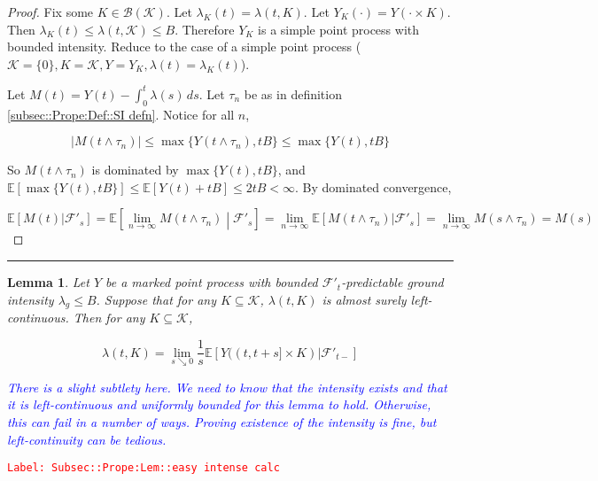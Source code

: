 \documentclass[12pt]{article}
\newcommand{\mb}{\mathbb}
\newcommand{\mc}{\mathcal}
\newcommand{\ms}{\mathscr}
\newcommand{\ra}{\rightarrow}
\newcommand{\tr}{\textcolor{red}}
\newcommand{\tb}{\textcolor{blue}}
\newcommand{\labe}[1]{\tr{\texttt{Label: #1}}}
\newcommand{\lin}{\rule{\linewidth}{0.4 pt}}
\newcommand{\ex}[1]{\mb{E}\left[#1\right]}			%
\newtheorem{lem}[thms]{Lemma}
\begin{document}
\begin{proof}
Fix some \(K \in \ms{B}(\mc{K})\). Let \(\lambda_K(t) = \lambda(t,K)\). Let \(Y_K(\cdot) = Y(\cdot\times K)\). Then \(\lambda_K(t) \leq \lambda(t,\mc{K}) \leq B\). Therefore \(Y_K\) is a simple point process with bounded intensity. Reduce to the case of a simple point process (\(\mc{K} = \{0\}, K = \mc{K}, Y = Y_K,\lambda(t) = \lambda_K(t)\)).

Let \(M(t) = Y(t) - \int_0^t \lambda(s)\,ds\). Let \(\tau_n\) be as in definition \ref{subsec::Prope:Def::SI defn}. Notice for all \(n\),

\[|M(t\wedge \tau_n)| \leq \max\{Y(t\wedge \tau_n),tB\}\leq \max\{Y(t),tB\}\]

So \(M(t\wedge\tau_n)\) is dominated by \(\max\{Y(t),tB\}\), and \(\ex{\max\{Y(t),tB\}} \leq \ex{Y(t) + tB} \leq 2tB < \infty\). By dominated convergence,

\[\ex{M(t)|\mc{F}'_s} = \ex{\lim_{n\ra\infty} M(t\wedge \tau_n)\middle|\mc{F}'_s} = \lim_{n\ra\infty}\ex{M(t\wedge \tau_n)|\mc{F}'_s} = \lim_{n\ra\infty} M(s\wedge \tau_n) = M(s)\]
\end{proof}

\lin

\begin{lem}
Let \(Y\) be a marked point process with bounded \(\mc{F}'_t\)-predictable ground intensity \(\lambda_g\leq B\). Suppose that for any \(K \subseteq \mc{K}\), \(\lambda(t,K)\) is almost surely left-continuous. Then for any \(K \subseteq \mc{K}\),

\[\lambda(t,K) = \lim_{s\searrow 0}\frac{1}{s}\ex{Y((t,t+s]\times K)|\mc{F}'_{t-}}\]

\tb{There is a slight subtlety here. We need to know that the intensity exists and that it is left-continuous and uniformly bounded for this lemma to hold. Otherwise, this can fail in a number of ways. Proving existence of the intensity is fine, but left-continuity can be tedious.}

\label{Subsec::Prope:Lem::easy intense calc}
\end{lem}
\labe{Subsec::Prope:Lem::easy intense calc}
\end{document}
